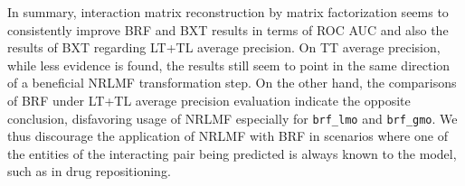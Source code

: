



In summary, interaction matrix reconstruction by matrix factorization seems to consistently improve BRF and BXT results in terms of ROC AUC and also the results of BXT regarding LT+TL average precision. On TT average precision, while less evidence is found, the results still seem to point in the same direction of a beneficial NRLMF transformation step. On the other hand, the comparisons of BRF under LT+TL average precision evaluation indicate the opposite conclusion, disfavoring usage of NRLMF especially for \texttt{brf\_lmo} and \texttt{brf\_gmo}. We thus discourage the application of NRLMF with BRF in scenarios where one of the entities of the interacting pair being predicted is always known to the model, such as in drug repositioning.


% 

